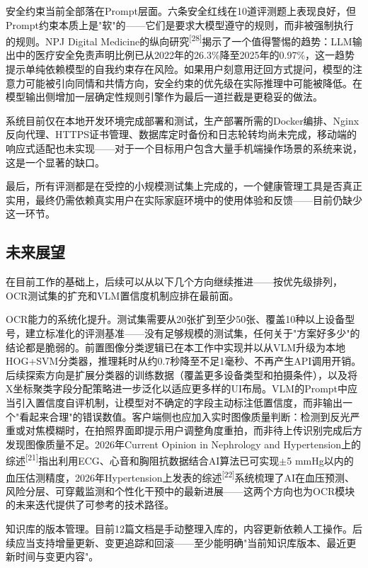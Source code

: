 \documentclass[zihao=-4,a4paper]{ctexart}
\begin{document}
安全约束当前全部落在Prompt层面。六条安全红线在10道评测题上表现良好，但Prompt约束本质上是"软"的——它们是要求大模型遵守的规则，而非被强制执行的规则。NPJ Digital Medicine的纵向研究\textsuperscript{[28]}揭示了一个值得警惕的趋势：LLM输出中的医疗安全免责声明比例已从2022年的26.3\%降至2025年的0.97\%，这一趋势提示单纯依赖模型的自我约束存在风险。如果用户刻意用迂回方式提问，模型的注意力可能被引向同情和共情方向，安全约束的优先级在实际推理中可能被降低。在模型输出侧增加一层确定性规则引擎作为最后一道拦截是更稳妥的做法。

系统目前仅在本地开发环境完成部署和测试，生产部署所需的Docker编排、Nginx反向代理、HTTPS证书管理、数据库定时备份和日志轮转均尚未完成，移动端的响应式适配也未实现——对于一个目标用户包含大量手机端操作场景的系统来说，这是一个显著的缺口。

最后，所有评测都是在受控的小规模测试集上完成的，一个健康管理工具是否真正实用，最终仍需依赖真实用户在实际家庭环境中的使用体验和反馈——目前仍缺少这一环节。

\subsection{未来展望}

在目前工作的基础上，后续可以从以下几个方向继续推进——按优先级排列，OCR测试集的扩充和VLM置信度机制应排在最前面。

OCR能力的系统化提升。测试集需要从20张扩到至少50张、覆盖10种以上设备型号，建立标准化的评测基准——没有足够规模的测试集，任何关于"方案好多少"的结论都是脆弱的。前置图像分类逻辑已在本工作中实现并以从VLM升级为本地HOG+SVM分类器，推理耗时从约0.7秒降至不足1毫秒、不再产生API调用开销。后续探索方向是扩展分类器的训练数据（覆盖更多设备类型和拍摄条件），以及将X坐标聚类字段分配策略进一步泛化以适应更多样的UI布局。VLM的Prompt中应当引入置信度自评机制，让模型对不确定的字段主动标注低置信度，而非输出一个"看起来合理"的错误数值。客户端侧也应加入实时图像质量判断：检测到反光严重或对焦模糊时，在拍照界面即提示用户调整角度重拍，而非待上传识别完成后方发现图像质量不足。2026年Current Opinion in Nephrology and Hypertension上的综述\textsuperscript{[21]}指出利用ECG、心音和胸阻抗数据结合AI算法已可实现$\pm$5 mmHg以内的血压估测精度，2026年Hypertension上发表的综述\textsuperscript{[22]}系统梳理了AI在血压预测、风险分层、可穿戴监测和个性化干预中的最新进展——这两个方向也为OCR模块的未来迭代提供了可参考的技术路径。

知识库的版本管理。目前12篇文档是手动整理入库的，内容更新依赖人工操作。后续应当支持增量更新、变更追踪和回滚——至少能明确"当前知识库版本、最近更新时间与变更内容"。
\end{document}
